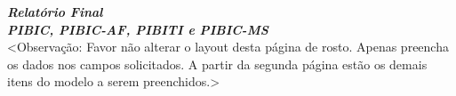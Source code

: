 \documentclass{article}
\begin{document}

\begin{center}
    \fontsize{16pt}{11.5}\selectfont\textbf{\textit{{Relatório Final}}}\\
    \vspace{0.2cm}
    \fontsize{12pt}{11.5}\selectfont\textbf{\textit{PIBIC, PIBIC-AF, PIBITI e PIBIC-MS}}\\
    \vspace{0.3cm}
    \fontsize{10pt}{11.5}\selectfont<Observação: Favor não alterar o layout desta página de rosto. Apenas preencha os dados nos campos solicitados. A partir da segunda página estão os demais itens do modelo a serem preenchidos.>
    
\vspace{0.5cm}






\vspace{0.5cm}

\end{center}

\pagebreak  


\begin{caixa}

\end{caixa}


\begin{caixa}[INTRODUÇÃO]

    
\end{caixa}
\end{document}
